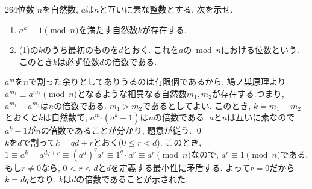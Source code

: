 \begin{thm}{264}{}{位数}
$n$を自然数, $a$は$n$と互いに素な整数とする. 次を示せ. 
\begin{enumerate} 
\item $a^k\equiv 1\pmod{n}$を満たす自然数$k$が存在する. 
\item (1)の$k$のうち最初のものを$d$とおく. これを$a$の$\bmod{n}$における位数という. このとき$k$は必ず位数$d$の倍数である.
\end{enumerate}
\end{thm}

$a^{m}$を$n$で割った余りとしてありうるのは有限個であるから, 鳩ノ巣原理より$a^{m_1}\equiv a^{m_2}\pmod{n}$となるような相異なる自然数$m_1,m_2$が存在する.つまり, $a^{m_1} - a^{m_2}$は$n$の倍数である. $m_1>m_2$であるとしてよい.  このとき, $k=m_1-m_2$とおくと$k$は自然数で, $a^{m_1}(a^{k} - 1)$は$n$の倍数である. $a$と$n$は互いに素なので$a^{k} - 1$が$n$の倍数であることが分かり, 題意が従う. \qed  \\

$k$を$d$で割って$k=qd + r$とおく($0\leq r<d$).  このとき, $1\equiv a^{k} = a^{dq + r} \equiv (a^{d})^{q} a^r\equiv 1^{q} \cdot a^{r} \equiv a^{r} \pmod{n}$なので, $a^{r} \equiv 1\pmod{n}$である. もし$r\neq 0$なら, $0< r<d$と$d$を定義する最小性に矛盾する. よって$r=0$だから$k=dq$となり, $k$は$d$の倍数であることが示された. 